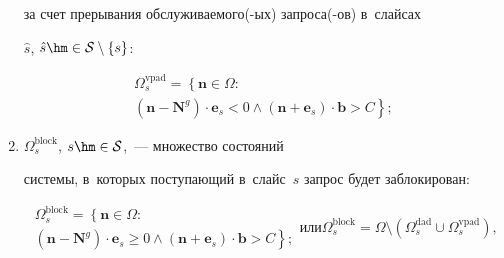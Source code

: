 \begin{multicols}{2}
\begin{enumerate}[(1)]
за счет прерывания об\-слу\-жи\-ва\-емо\-го(-ых) за\-про\-са(-ов) в~слайсах 


$\hat{s}$, $\hat{s}\hm\in\mathcal{S}\setminus\{s\}$:


\begin{multline}


\label{eq:SetPreemptionCapability}


\Omega_s^{\mathrm{vpad}} =


\left\{


\mathbf{n} \in \Omega: \right.\\ \left.


\left(\mathbf{n}-\mathbf{N}^{{g}}\right) \cdot \mathbf{e}_s < 0


\land


\left(\mathbf{n} + \mathbf{e}_s \right) \cdot \mathbf{b} > C


\right\};


\end{multline}


\item $\Omega_s^{\mathrm{block}}$, $s\hm\in\mathcal{S}$,~--- множество состояний 


системы, в~которых поступающий в~слайс~$s$ запрос будет заблокирован:


\begin{subequations}


\label{eq:SetBlocking}


\begin{multline}


\Omega_s^{\mathrm{block}} =


\left\{


\mathbf{n} \in \Omega: \right.\\ \left.


\left(\mathbf{n}-\mathbf{N}^{{g}}\right) \cdot \mathbf{e}_s \geq 0


\land


\left(\mathbf{n} + \mathbf{e}_s \right) \cdot \mathbf{b} > C


\right\};


\end{multline}


или


\begin{equation}


\Omega_s^{\mathrm{block}} = \Omega \setminus \left( \Omega_s^{\mathrm{dad}} \cup 


\Omega_s^{\mathrm{vpad} }\right),


\end{equation}



\end{subequations}
\end{enumerate}
\end{multicols}
